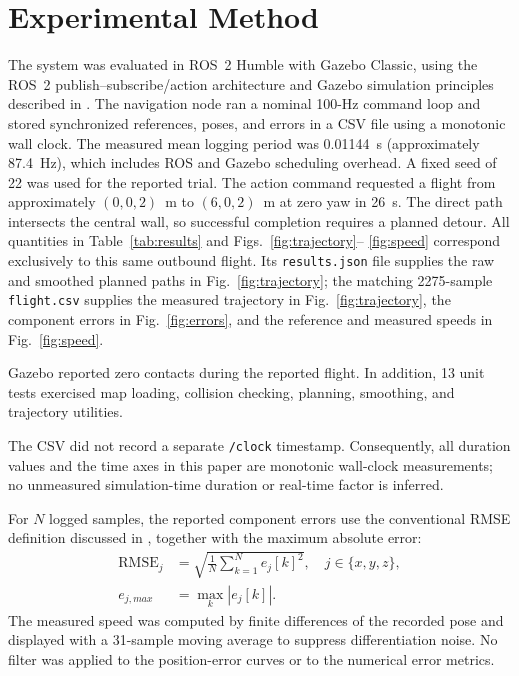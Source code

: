 \documentclass[conference]{IEEEtran}
\begin{document}
\section{Experimental Method}

The system was evaluated in ROS~2 Humble with Gazebo Classic, using the ROS~2
publish--subscribe/action architecture \cite{macenski2022} and Gazebo simulation
principles described in \cite{koenig2004}. The navigation node ran a nominal
100-Hz command loop and stored synchronized references,
poses, and errors in a CSV file using a monotonic wall clock. The measured mean
logging period was 0.01144~s (approximately 87.4~Hz), which includes ROS and
Gazebo scheduling overhead. A fixed seed of 22 was used for the reported trial.
The action command requested a flight from approximately
$(0,0,2)$~m to $(6,0,2)$~m at zero yaw in 26~s. The direct path intersects the
central wall, so successful completion requires a planned detour.
All quantities in Table~\ref{tab:results} and Figs.~\ref{fig:trajectory}--
\ref{fig:speed} correspond exclusively to this same outbound flight. Its
\texttt{results.json} file supplies the raw and smoothed planned paths in
Fig.~\ref{fig:trajectory}; the matching 2275-sample \texttt{flight.csv} supplies
the measured trajectory in Fig.~\ref{fig:trajectory}, the component errors in
Fig.~\ref{fig:errors}, and the reference and measured speeds in
Fig.~\ref{fig:speed}.

Gazebo reported zero contacts during the reported flight. In addition, 13 unit
tests exercised map loading, collision checking, planning, smoothing, and
trajectory utilities.

The CSV did not record a separate \texttt{/clock} timestamp. Consequently, all
duration values and the time axes in this paper are monotonic wall-clock
measurements; no unmeasured simulation-time duration or real-time factor is
inferred.

For $N$ logged samples, the reported component errors use the conventional RMSE
definition discussed in \cite{chai2014}, together with the maximum absolute
error:
\begin{align}
 \operatorname{RMSE}_j&=\sqrt{\frac{1}{N}\sum_{k=1}^{N}e_j[k]^2},
 \quad j\in\{x,y,z\},\label{eq:rmse}\\
 e_{j,max}&=\max_k|e_j[k]|.\label{eq:maxerror}
\end{align}
The measured speed was computed by finite differences of the recorded pose and
displayed with a 31-sample moving average to suppress differentiation noise. No
filter was applied to the position-error curves or to the numerical error
metrics.
\end{document}
